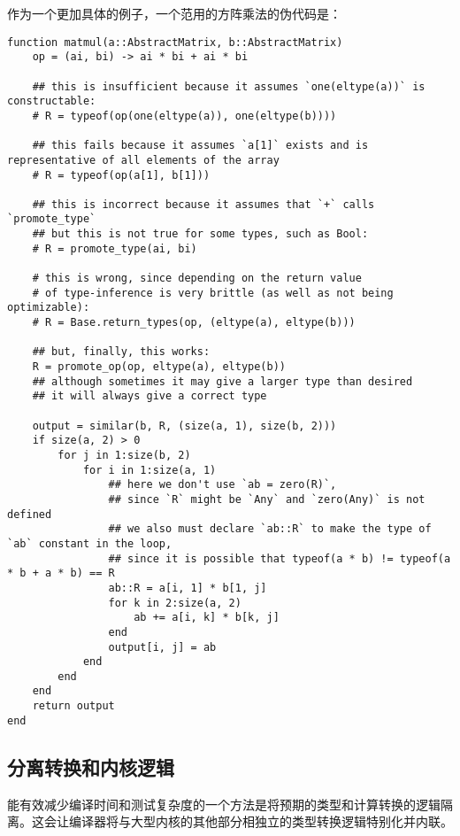作为一个更加具体的例子，一个范用的方阵乘法的伪代码是：




\begin{verbatim}
function matmul(a::AbstractMatrix, b::AbstractMatrix)
    op = (ai, bi) -> ai * bi + ai * bi

    ## this is insufficient because it assumes `one(eltype(a))` is constructable:
    # R = typeof(op(one(eltype(a)), one(eltype(b))))

    ## this fails because it assumes `a[1]` exists and is representative of all elements of the array
    # R = typeof(op(a[1], b[1]))

    ## this is incorrect because it assumes that `+` calls `promote_type`
    ## but this is not true for some types, such as Bool:
    # R = promote_type(ai, bi)

    # this is wrong, since depending on the return value
    # of type-inference is very brittle (as well as not being optimizable):
    # R = Base.return_types(op, (eltype(a), eltype(b)))

    ## but, finally, this works:
    R = promote_op(op, eltype(a), eltype(b))
    ## although sometimes it may give a larger type than desired
    ## it will always give a correct type

    output = similar(b, R, (size(a, 1), size(b, 2)))
    if size(a, 2) > 0
        for j in 1:size(b, 2)
            for i in 1:size(a, 1)
                ## here we don't use `ab = zero(R)`,
                ## since `R` might be `Any` and `zero(Any)` is not defined
                ## we also must declare `ab::R` to make the type of `ab` constant in the loop,
                ## since it is possible that typeof(a * b) != typeof(a * b + a * b) == R
                ab::R = a[i, 1] * b[1, j]
                for k in 2:size(a, 2)
                    ab += a[i, k] * b[k, j]
                end
                output[i, j] = ab
            end
        end
    end
    return output
end
\end{verbatim}



\hypertarget{1067448927897925814}{}


\subsection{分离转换和内核逻辑}



能有效减少编译时间和测试复杂度的一个方法是将预期的类型和计算转换的逻辑隔离。这会让编译器将与大型内核的其他部分相独立的类型转换逻辑特别化并内联。




